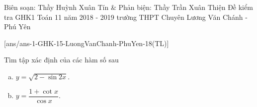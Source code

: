 	\begin{name}
{Biên soạn: Thầy Huỳnh Xuân Tín \& Phản biện: Thầy Trần Xuân Thiện}
{Đề kiểm tra GHK1 Toán 11 năm 2018 - 2019 trường THPT Chuyên Lương Văn Chánh - Phú Yên}
\end{name}

\setcounter{ex}{0}\setcounter{bt}{0}
[ans/ans-1-GHK-15-LuongVanChanh-PhuYen-18(TL)]

\begin{bt}%
	Tìm tập xác định của các hàm số sau
	\begin{enumerate}[a)]
\item $y=\sqrt{2-\sin 2x}$.
\item $y=\dfrac{1+\cot x}{\cos x}$.
\end{enumerate}
\end{bt}

